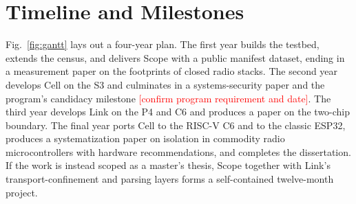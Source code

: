 \documentclass[conference,10pt]{IEEEtran}
\newcommand{\TODO}[1]{\textcolor{red}{[#1]}}
\begin{document}
\section{Timeline and Milestones}
\label{sec:timeline}

Fig.~\ref{fig:gantt} lays out a four-year plan. The first year builds the testbed, extends the census, and delivers Scope with a public manifest dataset, ending in a measurement paper on the footprints of closed radio stacks. The second year develops Cell on the S3 and culminates in a systems-security paper and the program's candidacy milestone \TODO{confirm program requirement and date}. The third year develops Link on the P4 and C6 and produces a paper on the two-chip boundary. The final year ports Cell to the RISC-V C6 and to the classic ESP32, produces a systematization paper on isolation in commodity radio microcontrollers with hardware recommendations, and completes the dissertation. If the work is instead scoped as a master's thesis, Scope together with Link's transport-confinement and parsing layers forms a self-contained twelve-month project.
\end{document}
